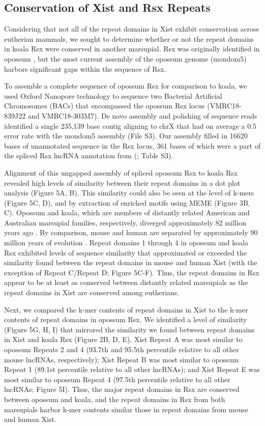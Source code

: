 \subsection{Conservation of Xist and Rsx Repeats}
Considering that not all of the repeat domains in Xist exhibit conservation across eutherian mammals, we sought to determine whether or not the repeat domains in koala Rsx were conserved in another marsupial. Rsx was originally identified in opossum \cite{Grant2012RsxInactivation}, but the most current assembly of the opossum genome (mondom5) harbors significant gaps within the sequence of Rsx. 

To assemble a complete sequence of opossum Rsx for comparison to koala, we used Oxford Nanopore technology to sequence two Bacterial Artificial Chromosomes (BACs) that encompassed the opossum Rsx locus (VMRC18-839J22 and VMRC18-303M7). De novo assembly and polishing of sequence reads identified a single 235,139 base contig aligning to chrX that had on average a 0.5 error rate with the mondom5 assembly (File S3). Our assembly filled in 16620 bases of unannotated sequence in the Rsx locus, 361 bases of which were a part of the spliced Rsx lncRNA annotation from (\cite{Grant2012RsxInactivation}; Table S3).

Alignment of this ungapped assembly of spliced opossum Rsx to koala Rsx revealed high levels of similarity between their repeat domains in a dot plot analysis (Figure 5A, B). This similarity could also be seen at the level of k-mers (Figure 5C, D), and by extraction of enriched motifs using MEME (Figure 3B, C). Opossum and koala, which are members of distantly related American and Australian marsupial families, respectively, diverged approximately 82 million years ago \cite{Kumar2017TimeTree:Times}. By comparison, mouse and human are separated by approximately 90 million years of evolution \cite{Kumar2017TimeTree:Times}. Repeat domains 1 through 4 in opossum and koala Rsx exhibited levels of sequence similarity that approximated or exceeded the similarity found between the repeat domains in mouse and human Xist (with the exception of Repeat C/Repeat D; Figure 5C-F). Thus, the repeat domains in Rsx appear to be at least as conserved between distantly related marsupials as the repeat domains in Xist are conserved among eutherians.

Next, we compared the k-mer contents of repeat domains in Xist to the k-mer contents of repeat domains in opossum Rsx. We identified a level of similarity (Figure 5G, H, I) that mirrored the similarity we found between repeat domains in Xist and koala Rsx (Figure 2B, D, E). Xist Repeat A was most similar to opossum Repeats 2 and 4 (93.7th and 95.5th percentile relative to all other mouse lncRNAs, respectively); Xist Repeat B was most similar to opossum Repeat 1 (89.1st percentile relative to all other lncRNAs); and Xist Repeat E was most similar to opossum Repeat 4 (97.5th percentile relative to all other lncRNAs; Figure 5I). Thus, the major repeat domains in Rsx are conserved between opossum and koala, and the repeat domains in Rsx from both marsupials harbor k-mer contents similar those in repeat domains from mouse and human Xist.

